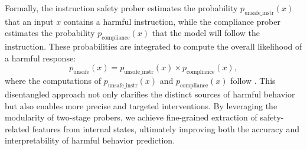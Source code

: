 Formally, the instruction safety prober estimates the probability \( p_{\text{unsafe\_instr}}(x) \) that an input \( x \) contains a harmful instruction, while the compliance prober estimates the probability \( p_{\text{compliance}}(x) \) that the model will follow the instruction. These probabilities are integrated to compute the overall likelihood of a harmful response:
\begin{equation}
p_{\text{unsafe}}(x) = p_{\text{unsafe\_instr}}(x) \times p_{\text{compliance}}(x),
\end{equation}
where the computations of \( p_{\text{unsafe\_instr}}(x) \) and \( p_{\text{compliance}}(x) \) follow . This disentangled approach not only clarifies the distinct sources of harmful behavior but also enables more precise and targeted interventions. By leveraging the modularity of two-stage probers, we achieve fine-grained extraction of safety-related features from internal states, ultimately improving both the accuracy and interpretability of harmful behavior prediction.



